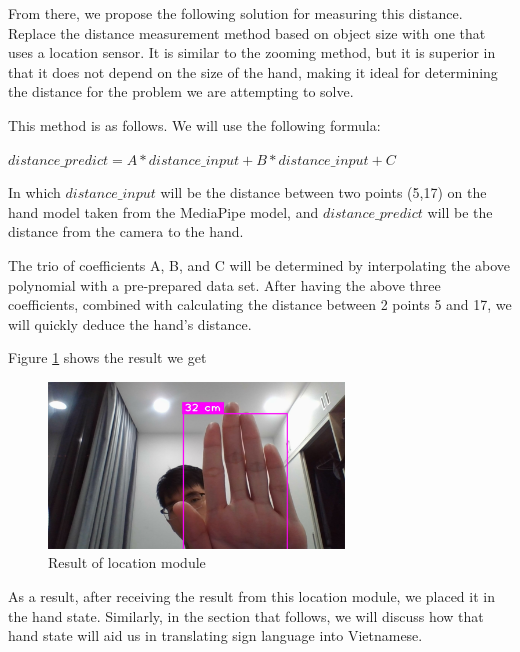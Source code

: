From there, we propose the following solution for measuring this distance. Replace the distance measurement method based on object size with one that uses a location sensor. It is similar to the zooming method, but it is superior in that it does not depend on the size of the hand, making it ideal for determining the distance for the problem we are attempting to solve.

This method is as follows. We will use the following formula:
\begin{center}
  $ distance\_predict = A*distance\_input + B*distance\_input + C $ 
\end{center}

In which $distance\_input$ will be the distance between two points (5,17) on the hand model taken from the MediaPipe model, and $distance\_predict$ will be the distance from the camera to the hand.

The trio of coefficients A, B, and C will be determined by interpolating the above polynomial with a pre-prepared data set. After having the above three coefficients, combined with calculating the distance between 2 points 5 and 17, we will quickly deduce the hand's distance. 

Figure \ref{fig:Chap4-LocationModule} shows the result we get

\begin{figure}[H]
	\centering
	\includegraphics[width=0.7\textwidth]{img/Chap4/Location_00.jpg}
	\caption{Result of location module}
	\label{fig:Chap4-LocationModule}
\end{figure}

As a result, after receiving the result from this location module, we placed it in the hand state. Similarly, in the section that follows, we will discuss how that hand state will aid us in translating sign language into Vietnamese.

  
